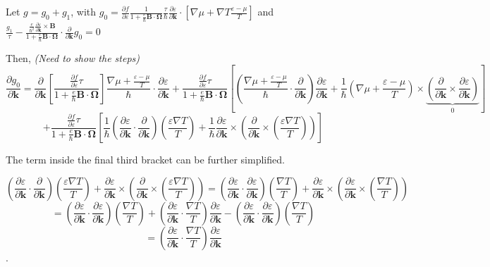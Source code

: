 \documentclass{revtex4-2}
\newcommand{\bvec}[1]{{\mathbf #1}}
\begin{document}
Let $g = g_0 + g_1$, with $g_0 = \frac{\partial f}{\partial \varepsilon}\frac{1}{1 + \frac{e}{\hbar} \bvec{B}\cdot\bvec{\Omega}}
\frac{\tau}{\hbar} \frac{\partial \varepsilon}{\partial \bvec{k}}\cdot\left[ \nabla{\mu} + \nabla T \frac{\varepsilon - \mu}{T}\right]$ and $\frac{g_1}{\tau} -\frac{\frac{e}{\hbar^2} \frac{\partial \varepsilon}{\partial \bvec{k}} \times \bvec{B}}{1 + \frac{e}{\hbar} \bvec{B}\cdot\bvec{\Omega}} \cdot\frac{\partial}{\partial \bvec{k}} g_0 = 0$

Then, \textit{(Need to show the steps)}
$$\frac{\partial g_0}{\partial \bvec{k}} = 
\frac{\partial}{\partial \bvec{k}} \left[ \frac{\frac{\partial f} {\partial \varepsilon} \tau}{1 + \frac{e}{\hbar} \bvec{B}\cdot\bvec{\Omega}}
\right] \frac{\nabla \mu + \frac{\varepsilon - \mu}{T}}{\hbar} \cdot \frac{\partial \varepsilon}{\partial \bvec{k}} + \frac{\frac{\partial f} {\partial \varepsilon} \tau}{1 + \frac{e}{\hbar} \bvec{B}\cdot\bvec{\Omega}} \left[(\frac{\nabla \mu + \frac{\varepsilon - \mu}{T}}{\hbar} \cdot \frac{\partial }{\partial \bvec{k}} )\frac{\partial \varepsilon}{\partial \bvec{k}} + \frac{1}{\hbar} (\nabla \mu + \frac{\varepsilon - \mu}{T})\times \underbrace{(\frac{\partial }{\partial \bvec{k}} \times \frac{\partial \varepsilon}{\partial \bvec{k}})}_0 \right]
$$
$$+ \frac{\frac{\partial f} {\partial \varepsilon} \tau}{1 + \frac{e}{\hbar} \bvec{B}\cdot\bvec{\Omega}} \left[\frac{1}{\hbar} (\frac{\partial \varepsilon}{\partial \bvec{k}} \cdot \frac{\partial }{\partial \bvec{k}}) (\frac{\varepsilon \nabla T}{T}) + \frac{1}{\hbar} \frac{\partial \varepsilon}{\partial \bvec{k}} \times \left(  \frac{\partial }{\partial \bvec{k}} \times \left(\frac{\varepsilon \nabla T}{T}\right) \right) \right]$$

The term inside the final third bracket can be further simplified.

$$ (\frac{\partial \varepsilon}{\partial \bvec{k}} \cdot \frac{\partial }{\partial \bvec{k}}) (\frac{\varepsilon \nabla T}{T}) + \frac{\partial \varepsilon}{\partial \bvec{k}} \times \left(  \frac{\partial }{\partial \bvec{k}} \times \left(\frac{\varepsilon \nabla T}{T}\right) \right) = (\frac{\partial \varepsilon}{\partial \bvec{k}} \cdot \frac{\partial \varepsilon}{\partial \bvec{k}}) (\frac{ \nabla T}{T}) + \frac{\partial \varepsilon}{\partial \bvec{k}} \times \left(  \frac{\partial \varepsilon}{\partial \bvec{k}} \times \left(\frac{\nabla T}{T}\right) \right)$$
$$  =(\frac{\partial \varepsilon}{\partial \bvec{k}} \cdot \frac{\partial \varepsilon}{\partial \bvec{k}}) (\frac{ \nabla T}{T}) + \left(  \frac{\partial \varepsilon}{\partial \bvec{k}} \cdot \frac{\nabla T}{T}\right) \frac{\partial \varepsilon}{\partial \bvec{k}} -  (\frac{\partial \varepsilon}{\partial \bvec{k}} \cdot \frac{\partial \varepsilon}{\partial \bvec{k}}) (\frac{ \nabla T}{T})$$
$$= \left(  \frac{\partial \varepsilon}{\partial \bvec{k}} \cdot \frac{\nabla T}{T}\right) \frac{\partial \varepsilon}{\partial \bvec{k}}$$.
\end{document}
